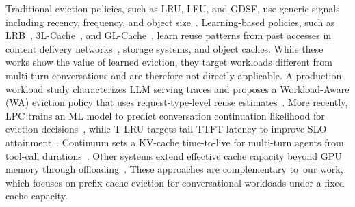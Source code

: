 \documentclass{article}
\newcommand{\jiny}[1]{\textcolor{orange}{[Jiny: #1]}}
\newcommand{\bo}[1]{\textcolor{red}{[Bo: #1]}}
\begin{document}
Traditional eviction policies, such as LRU, LFU, and GDSF, use generic signals including recency, frequency, and object size~\cite{cherkasova1998improving}. Learning-based policies, such as LRB~\cite{246346}, 3L-Cache~\cite{zhou20253l}, and GL-Cache~\cite{yang2023gl}, learn reuse patterns from past accesses in content delivery networks~\cite{saroiu2002analysis}, storage systems, and object caches. While these works show the value of learned eviction, they target workloads different from multi-turn conversations and are therefore not directly applicable. A production workload study characterizes LLM serving traces and proposes a Workload-Aware (WA) eviction policy that uses request-type-level reuse estimates~\cite{wang2025kvcache}. More recently, LPC trains an ML model to predict conversation continuation likelihood for eviction decisions~\cite{yanglearned}, while T-LRU targets tail TTFT latency to improve SLO attainment~\cite{zhang2025tailoptimized}. Continuum sets a KV-cache time-to-live for multi-turn agents from tool-call durations~\cite{li2025continuum}. Other systems extend effective cache capacity beyond GPU memory through offloading~\cite{liu2024cachegen, 10.1145/3689031.3696098, cheng2025lmcache}. These approaches are complementary to~our work, which focuses on prefix-cache eviction for conversational workloads under a fixed cache capacity.





\end{document}
